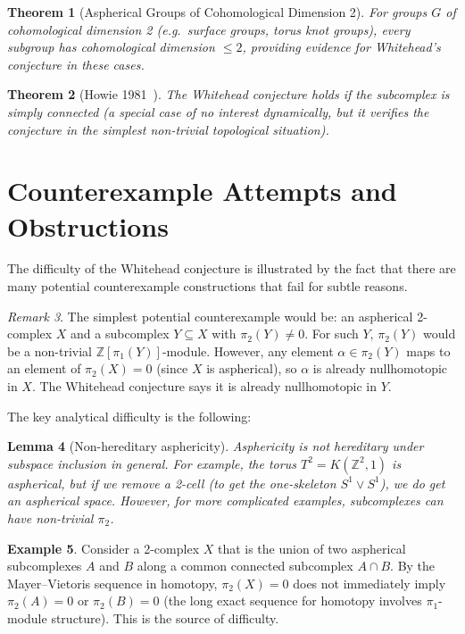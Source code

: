 \documentclass[12pt,a4paper]{amsart}
\newtheorem{theorem}{Theorem}[section]
\newtheorem{lemma}[theorem]{Lemma}
\theoremstyle{definition}
\newtheorem{example}[theorem]{Example}
\theoremstyle{remark}
\newtheorem{remark}[theorem]{Remark}
\newcommand{\Z}{\mathbb{Z}}
\begin{document}
\begin{theorem}[Aspherical Groups of Cohomological Dimension 2]
For groups $G$ of cohomological dimension 2 (e.g.\ surface groups,
torus knot groups), every subgroup has cohomological dimension $\leq 2$,
providing evidence for Whitehead's conjecture in these cases.
\end{theorem}

\begin{theorem}[Howie 1981~\cite{Howie1981}]
The Whitehead conjecture holds if the subcomplex is simply connected
(a special case of no interest dynamically, but it verifies the
conjecture in the simplest non-trivial topological situation).
\end{theorem}

\section{Counterexample Attempts and Obstructions}

The difficulty of the Whitehead conjecture is illustrated by the fact that
there are many potential counterexample constructions that fail for
subtle reasons.

\begin{remark}
The simplest potential counterexample would be: an aspherical 2-complex $X$
and a subcomplex $Y \subseteq X$ with $\pi_2(Y) \neq 0$. For such $Y$,
$\pi_2(Y)$ would be a non-trivial $\Z[\pi_1(Y)]$-module. However, any
element $\alpha \in \pi_2(Y)$ maps to an element of $\pi_2(X) = 0$ (since
$X$ is aspherical), so $\alpha$ is already nullhomotopic in $X$.
The Whitehead conjecture says it is already nullhomotopic in $Y$.
\end{remark}

The key analytical difficulty is the following:

\begin{lemma}[Non-hereditary asphericity]
Asphericity is not hereditary under subspace inclusion in general.
For example, the torus $T^2 = K(\Z^2, 1)$ is aspherical, but if we
remove a 2-cell (to get the one-skeleton $S^1 \vee S^1$), we do get
an aspherical space. However, for more complicated examples, subcomplexes
can have non-trivial $\pi_2$.
\end{lemma}

\begin{example}
Consider a 2-complex $X$ that is the union of two aspherical subcomplexes
$A$ and $B$ along a common connected subcomplex $A \cap B$. By the
Mayer--Vietoris sequence in homotopy, $\pi_2(X) = 0$ does not immediately
imply $\pi_2(A) = 0$ or $\pi_2(B) = 0$ (the long exact sequence for
homotopy involves $\pi_1$-module structure). This is the source of difficulty.
\end{example}
\end{document}
